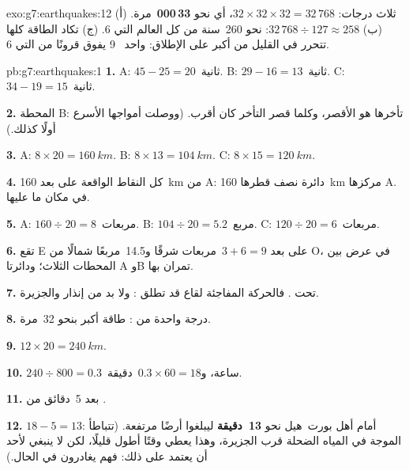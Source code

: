 \begin{solution}{exo:g7:earthquakes:12}
(أ) ثلاث درجات: $32 \times 32 \times 32 = 32\,768$، أي نحو
\textbf{33\,000}~مرة. (ب) $32\,768 \div 127 \approx 258$: نحو
260~سنة من كل  العالم التي  6. (ج) تكاد الطاقة كلها تتحرر في
القليل من أكبر  على الإطلاق:  واحد ~9 يفوق قرونًا من
 التي  6.
\end{solution}

\begin{solution}{pb:g7:earthquakes:1}
\textbf{1.} A: $45 - 25 = 20$~ثانية. B: $29 - 16 = 13$~ثانية. C: $34 - 19 =
15$~ثانية.

\textbf{2.} المحطة B: تأخرها هو الأقصر، وكلما قصر التأخر كان 
أقرب. (ووصلت أمواجها الأسرع أولًا كذلك.)

\textbf{3.} A: $8 \times 20 = \qty{160}{km}$. B: $8 \times 13 =
\qty{104}{km}$. C: $8 \times 15 = \qty{120}{km}$.

\textbf{4.} كل النقاط الواقعة على بعد \qty{160}{km} من A: دائرة نصف قطرها
\qty{160}{km} مركزها A.  في مكان ما عليها.

\textbf{5.} A: $160 \div 20 = 8$~مربعات. B: $104 \div 20 = 5.2$~مربع.
C: $120 \div 20 = 6$~مربعات.

\textbf{6.} تقع E على بعد $3 + 6 = 9$~مربعات شرقًا و14.5~مربعًا شمالًا من
O، في عرض  بين المحطات الثلاث؛ ودائرتا A وB تمران بها.

\textbf{7.} تحت . فالحركة المفاجئة لقاع  قد تطلق : ولا بد
من إنذار  والجزيرة.

\textbf{8.} درجة واحدة من : طاقة أكبر بنحو 32~مرة.

\textbf{9.} $12 \times 20 = \qty{240}{km}$.

\textbf{10.} $240 \div 800 = 0.3$~ساعة، و$0.3 \times 60 = 18$~دقيقة.

\textbf{11.} بعد 5~دقائق من .

\textbf{12.} $18 - 5 = 13$: أمام أهل بورت~هيل نحو \textbf{13~دقيقة}
ليبلغوا أرضًا مرتفعة. (تتباطأ الموجة في المياه الضحلة قرب الجزيرة، وهذا
يعطي وقتًا أطول قليلًا، لكن لا ينبغي لأحد أن يعتمد على ذلك: فهم يغادرون
في الحال.)
\end{solution}
